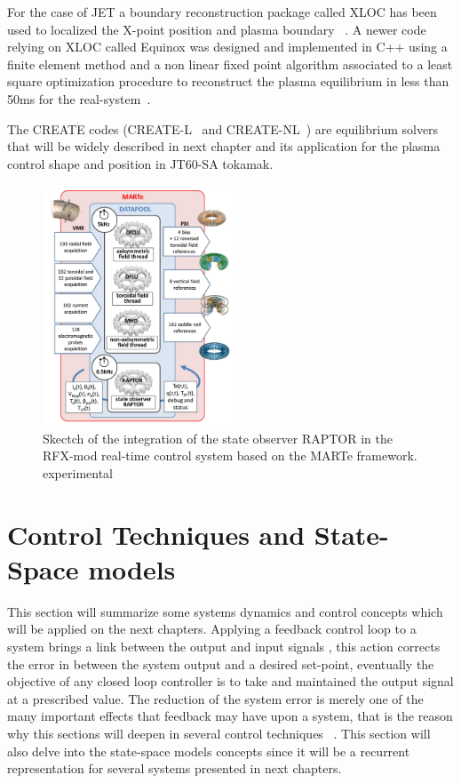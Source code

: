 For the case of JET  a  boundary reconstruction package called XLOC has been used to localized the X-point position and plasma boundary ~\cite{xloc}.  A newer code relying on XLOC  called Equinox was designed and implemented in C++ using a finite element method and a non linear fixed point algorithm associated to a least  square optimization procedure to reconstruct the plasma equilibrium in less than 50ms for the real-system~\cite{equinox}. 
\smallskip


The CREATE  codes (CREATE-L~\cite{Albanese:CREATEL} and CREATE-NL~\cite{Albanese:CREATENL}) are  equilibrium solvers that will be widely described in next chapter  and its application for the plasma control shape and  position in JT60-SA tokamak.
 
\begin{figure}[htbp]
	\centering
	\includegraphics[width=0.505\textwidth]{Chp2/raptorMARTe.png}
	\caption{\label{RaptorMARTe} Skectch of the integration of the state observer RAPTOR in the RFX-mod real-time control system based on the MARTe framework.
		experimental \cite{Raptor}}
	
\end{figure}

\section{Control Techniques and State-Space models}

This section will summarize  some systems dynamics and control  concepts which will be applied on the next chapters. Applying a feedback control loop to a system  brings a link between the output and input signals , this action corrects the error in between the system output and a desired set-point,  eventually  the objective  of any closed loop controller is to take and maintained  the output signal at a prescribed value. The reduction of the system error is merely one of the many important effects that feedback may have upon a system, that is the reason why this sections will deepen in several control techniques ~\cite[Chapter~1]{Golnaraghi2010}. This section will also delve into the state-space models concepts since it will be a recurrent representation  for several systems presented in next chapters.

